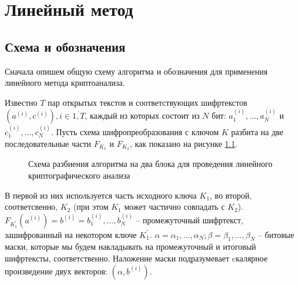 \documentclass[utf8x, 14pt]{G7-32} %
\begin{document}

\chapter{Линейный метод}
\section{Схема и обозначения}
Сначала опишем общую схему алгоритма и обозначения для применения линейного метода криптоанализа.

Известно $T$ пар открытых текстов и соответствующих шифртекстов $(a^{(i)}, c^{(i)}), i\in\overline{1,T}$, каждый из которых состоит из $N$ бит: $a_1^{(i)}, ..., a_N^{(i)}$ и $c_1^{(i)}, ..., c_N^{(i)}$. Пусть схема шифропреобразования с ключом $K$ разбита на две последовательные части $F_{K_1}$ и $F_{K_2}$, как показано на рисунке \ref{fig:linan}. 
\begin{figure}[h!]
	\centering
	\caption{Схема разбиения алгоритма на два блока для проведения линейного криптографического анализа}
	\label{fig:linan}
\end{figure}



В первой из них используется часть исходного ключа $K_1$, во второй, соответсвенно, $K_2$ (при этом $K_1$ может частично совпадать с $K_2$). $F_{K_1^{'}}(a^{(i)}) = b^{(i)} = b_1^{(i)}, ..., b_N^{(i)}$ -- промежуточный шифртекст, зашифрованный на некотором ключе $K_1^{'}$. $\alpha = \alpha_1, ..., \alpha_N; \beta = \beta_1, ..., \beta_N$ -- битовые маски, которые мы будем накладывать на промежуточный и итоговый шифртексты, соответственно. Наложение маски подразумевает cкалярное произведение двух векторов: $(\alpha, b^{(i)})$.
\end{document}
